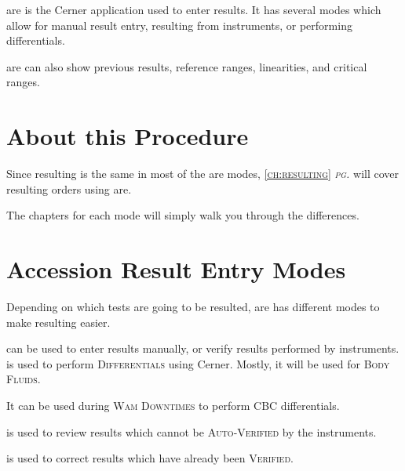 \Gls{are} is the Cerner application used to enter results. It has several modes which allow for manual result entry, resulting from instruments, or performing differentials.

\gls{are} can also show previous results, reference ranges, linearities, and critical ranges.

\section{About this Procedure}


Since resulting is the same in most of the \gls{are} modes, \textsc{\autoref{ch:resulting}  \textit{pg.}\pageref{ch:resulting}} will cover resulting orders using \acrlong{are}.

The chapters for each mode will simply walk you through the differences.

\section{Accession Result Entry Modes}
Depending on which tests are going to be resulted, \gls{are} has different modes to make resulting easier.

\begin{description}
     can be used to enter results manually, or verify results performed by instruments.
     is used to perform \textsc{Differentials} using Cerner. Mostly, it will be used for \textsc{Body Fluids}.

    It can be used during \textsc{Wam Downtimes} to perform CBC differentials.

     is used to review results which cannot be \textsc{Auto-Verified} by the instruments.

     is used to correct results which have already been \textsc{Verified.}
\end{description}



